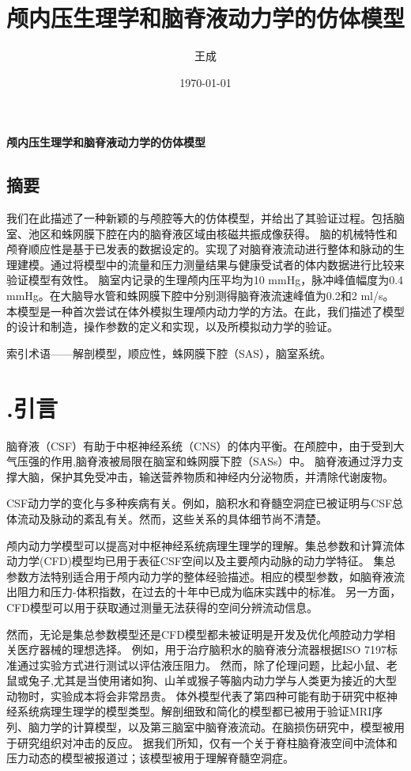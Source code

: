 \documentclass[12pt]{article}
\title{颅内压生理学和脑脊液动力学的仿体模型}
\author{王成}
\date{\today}
\begin{document}

\begin{center}
    \Large\textbf{颅内压生理学和脑脊液动力学的仿体模型}
\end{center}

\begin{center}
    \section*{摘要}
\end{center}

我们在此描述了一种新颖的与颅腔等大的仿体模型，并给出了其验证过程。包括脑室、池区和蛛网膜下腔在内的脑脊液区域由核磁共振成像获得。
脑的机械特性和颅脊顺应性是基于已发表的数据设定的。实现了对脑脊液流动进行整体和脉动的生理建模。通过将模型中的流量和压力测量结果与健康受试者的体内数据进行比较来验证模型有效性。
脑室内记录的生理颅内压平均为10 mmHg，脉冲峰值幅度为0.4 mmHg。在大脑导水管和蛛网膜下腔中分别测得脑脊液流速峰值为0.2和2 ml/s。
本模型是一种首次尝试在体外模拟生理颅内动力学的方法。在此，我们描述了模型的设计和制造，操作参数的定义和实现，以及所模拟动力学的验证。

索引术语——解剖模型，顺应性，蛛网膜下腔（SAS），脑室系统。

\section*{\uppercase\expandafter{}.引言}

脑脊液（CSF）有助于中枢神经系统（CNS）的体内平衡。在颅腔中，由于受到大气压强的作用,脑脊液被局限在脑室和蛛网膜下腔（SASs）中。
脑脊液通过浮力支撑大脑，保护其免受冲击，输送营养物质和神经内分泌物质，并清除代谢废物。

CSF动力学的变化与多种疾病有关。例如，脑积水和脊髓空洞症已被证明与CSF总体流动及脉动的紊乱有关。然而，这些关系的具体细节尚不清楚。

颅内动力学模型可以提高对中枢神经系统病理生理学的理解。集总参数和计算流体动力学(CFD)模型均已用于表征CSF空间以及主要颅内动脉的动力学特征。
集总参数方法特别适合用于颅内动力学的整体经验描述。相应的模型参数，如脑脊液流出阻力和压力-体积指数，在过去的十年中已成为临床实践中的标准。
另一方面，CFD模型可以用于获取通过测量无法获得的空间分辨流动信息。

然而，无论是集总参数模型还是CFD模型都未被证明是开发及优化颅腔动力学相关医疗器械的理想选择。
例如，用于治疗脑积水的脑脊液分流器根据ISO 7197标准通过实验方式进行测试以评估液压阻力。
然而，除了伦理问题，比起小鼠、老鼠或兔子,尤其是当使用诸如狗、山羊或猴子等脑内动力学与人类更为接近的大型动物时，实验成本将会非常昂贵。
体外模型代表了第四种可能有助于研究中枢神经系统病理生理学的模型类型。解剖细致和简化的模型都已被用于验证MRI序列、脑力学的计算模型，以及第三脑室中脑脊液流动。在脑损伤研究中，模型被用于研究组织对冲击的反应。
据我们所知，仅有一个关于脊柱脑脊液空间中流体和压力动态的模型被报道过；该模型被用于理解脊髓空洞症。
\end{document}

